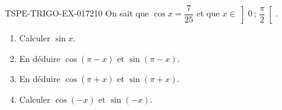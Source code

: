 \begin{exercice}{TSPE-TRIGO-EX-017}{2}{10}
On sait que $\cos x = \dfrac{7}{25}$ et que $x \in \left]0\,;\,\dfrac{\pi}{2}\right[$.
\begin{enumerate}
  \item Calculer $\sin x$.
  \item En déduire $\cos(\pi - x)$ et $\sin(\pi - x)$.
  \item En déduire $\cos(\pi + x)$ et $\sin(\pi + x)$.
  \item Calculer $\cos(-x)$ et $\sin(-x)$.
\end{enumerate}
\end{exercice}

